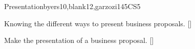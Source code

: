 \begin{syllabus}
\begin{unit}{}{Presentation}{byers10,blank12,garzozi14}{5}{CS5}
      \begin{learningoutcomes} 
         \item Knowing the different ways to present business proposals. [\Familiarity]
         \item Make the presentation of a business proposal. [\Usage]
      \end{learningoutcomes} 
   \end{unit}
   
   \begin{coursebibliography}
   \end{coursebibliography}
   
   \end{syllabus}
   
   